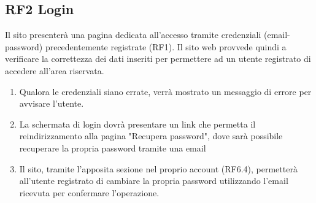 \documentclass[a4paper,12pt]{article}
\begin{document}
\subsection*{RF2 Login}
 Il sito presenterà una pagina dedicata all’accesso tramite credenziali (email-password) precedentemente registrate (RF1).
 Il sito web provvede quindi a verificare la correttezza dei dati inseriti per permettere ad un utente registrato di accedere all'area riservata.
 \begin{enumerate} [leftmargin=40pt]
    \item Qualora le credenziali siano errate, verrà mostrato un messaggio di errore per avvisare l'utente.
    \item La schermata di login dovrà presentare un link che permetta il reindirizzamento alla pagina "Recupera password", dove sarà possibile recuperare la propria password tramite una email
    \item Il sito, tramite l’apposita sezione nel proprio account (RF6.4), permetterà all’utente registrato di cambiare la propria password utilizzando l’email ricevuta per confermare l'operazione.
\end{enumerate}
\end{document}
